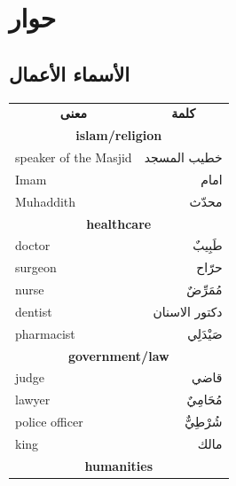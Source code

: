 \documentclass[]{book}
\begin{document}
\hypertarget{conversation}{%
\chapter{حوار}\label{conversation}}

\hypertarget{ux627ux644ux623ux633ux645ux627ux621-ux627ux644ux623ux639ux645ux627ux644}{%
\section{الأسماء الأعمال}\label{ux627ux644ux623ux633ux645ux627ux621-ux627ux644ux623ux639ux645ux627ux644}}

\begin{table}[]
\begin{tabular}{lr}
\multicolumn{1}{c}{\textbf{معنى}} & \multicolumn{1}{c}{\textbf{كلمة}} \\
\multicolumn{2}{c}{\textbf{islam/religion}}                           \\
speaker of the Masjid             & خطيب المسجد                       \\
Imam                              & امام                              \\
Muhaddith                         & محدّث                             \\
\multicolumn{2}{c}{\textbf{healthcare}}                               \\
doctor                            & طَبِيبٌ                           \\
surgeon                           & حرّاح                             \\
nurse                             & مُمَرِّضٌ                         \\
dentist                           & دكتور الاسنان                     \\
pharmacist                        & صَيْدَلِي                         \\
\multicolumn{2}{c}{\textbf{government/law}}                           \\
judge                             & قاضي                              \\
lawyer                            & مُحَامِيٌ                         \\
police officer                    & شُرْطِيٌّ                         \\
king                              & مالك                              \\
\multicolumn{2}{c}{\textbf{humanities}}                               \\

\end{tabular}
\end{table}
\end{document}

